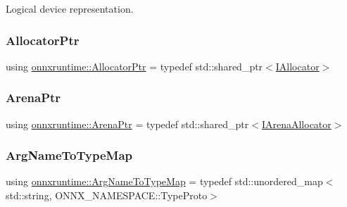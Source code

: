Logical device representation. \mbox{\label{namespaceonnxruntime_a6cdac724c5dcefded3a63f08dae58fda}} 
\subsubsection{\texorpdfstring{Allocator\+Ptr}{AllocatorPtr}}
{\footnotesize\ttfamily using \mbox{\hyperlink{namespaceonnxruntime_a6cdac724c5dcefded3a63f08dae58fda}{onnxruntime\+::\+Allocator\+Ptr}} = typedef std\+::shared\+\_\+ptr$<$\mbox{\hyperlink{classonnxruntime_1_1IAllocator}{I\+Allocator}}$>$}

\mbox{\label{namespaceonnxruntime_a948c3723a3b3768b6102ee9cc3a21cb4}} 
\subsubsection{\texorpdfstring{Arena\+Ptr}{ArenaPtr}}
{\footnotesize\ttfamily using \mbox{\hyperlink{namespaceonnxruntime_a948c3723a3b3768b6102ee9cc3a21cb4}{onnxruntime\+::\+Arena\+Ptr}} = typedef std\+::shared\+\_\+ptr$<$\mbox{\hyperlink{classonnxruntime_1_1IArenaAllocator}{I\+Arena\+Allocator}}$>$}

\mbox{\label{namespaceonnxruntime_af1034bc0805c639a07a415656396beb3}} 
\subsubsection{\texorpdfstring{Arg\+Name\+To\+Type\+Map}{ArgNameToTypeMap}}
{\footnotesize\ttfamily using \mbox{\hyperlink{namespaceonnxruntime_af1034bc0805c639a07a415656396beb3}{onnxruntime\+::\+Arg\+Name\+To\+Type\+Map}} = typedef std\+::unordered\+\_\+map$<$std\+::string, O\+N\+N\+X\+\_\+\+N\+A\+M\+E\+S\+P\+A\+C\+E\+::\+Type\+Proto$>$}

\mbox{\label{namespaceonnxruntime_afb993460ae8432beef9db5f0cf10ca7c}} 
